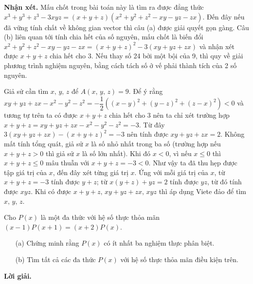 \textbf{Nhận xét. }Mấu chốt trong bài toán này là tìm ra được đẳng thức $x^3 + y^3 + z^3 - 3xyz = (x+y+z)(x^2+y^2+z^2-xy-yz-zx)$. Đến đây nếu đã vững tính chất về không gian vector thì câu (a) được giải quyết gọn gàng. Câu (b) liên quan tới tính chia hết của số nguyên, mấu chốt là biến đổi $x^2+y^2+z^2-xy-yz-zx = (x+y+z)^2 - 3(xy+yz+zx)$ và nhận xét được $x+y+z$ chia hết cho 3. Nếu thay số 24 bởi một bội của 9, thì quy về giải phương trình nghiệm nguyên, bằng cách tách số ở vế phải thành tích của 2 số nguyên. 

Giả sử cần tìm $x,\,y,\,z$ để $A(x,\,y,\,z) = 9$. Để ý rằng $xy+yz+zx-x^2-y^2-z^2 = -\dfrac{1}{2}\left((x-y)^2 + (y-z)^2 + (z-x)^2\right) < 0$ và tương tự trên ta có được $x+y+z$ chia hết cho 3 nên ta chỉ xét trường hợp $x+y+z = xy+yz+zx-x^2-y^2-z^2 = -3$. Từ đây $3(xy+yz+zx)-(x+y+z)^2 = -3$ nên tính được $xy+yz+zx = 2$. Không mất tính tổng quát, giả sử $x$ là số nhỏ nhất trong ba số (trường hợp nếu $x+y+z > 0$ thì giả sử $x$ là số lớn nhất). Khi đó $x < 0$, vì nếu $x \leq 0$ thì $x + y + z \leq 0$ mâu thuẫn với $x + y + z = -3 < 0$. Như vậy ta đã thu hẹp được tập giá trị của $x$, đến đây xét từng giá trị $x$. Ứng với mỗi giá trị của $x$, từ $x + y + z = -3$ tính được $y + z$; từ $x(y+z) + yz=2$ tính được $yz$, từ đó tính được $xyz$. Khi có được $x+y+z,\,xy+yz+zx,\,xyz$ thì áp dụng Viete đảo để tìm $x,\,y,\,z$.

\begin{tcolorbox}[title=\textbf{Bài toán A.3.},breakable]
    Cho $P(x)$ là một đa thức với hệ số thực thỏa mãn $(x-1)P(x+1) = (x+2)P(x)$.
    \begin{enumerate}
        \item[(a)] {Chứng minh rằng $P(x)$ có ít nhất ba nghiệm thực phân biệt.}
        \item[(b)] {Tìm tất cả các đa thức $P(x)$ với hệ số thực thỏa mãn điều kiện trên.}
    \end{enumerate}
\end{tcolorbox}

\textbf{Lời giải. }

